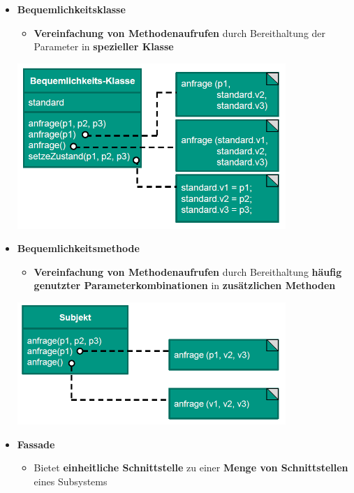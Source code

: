 \documentclass[parskip=full, 12pt]{scrartcl}
\begin{document}
				\begin{itemize}
					\item \textbf{Bequemlichkeitsklasse}
					\begin{itemize}
						\item \textbf{Vereinfachung von Methodenaufrufen} durch Bereithaltung der Parameter in \textbf{spezieller Klasse}
					\end{itemize}
					\begin{center}
						\includegraphics[width=0.8\textwidth]{../images/bequemlichkeitsklasse.png}
					\end{center}
					\item \textbf{Bequemlichkeitsmethode}
					\begin{itemize}
						\item \textbf{Vereinfachung von Methodenaufrufen} durch Bereithaltung \textbf{häufig genutzter Parameterkombinationen} in \textbf{zusätzlichen Methoden}
					\end{itemize}
					\begin{center}
						\includegraphics[width=0.8\textwidth]{../images/bequemlichkeitsmethode.png}
					\end{center}
					\newpage
					\item \textbf{Fassade}
					\begin{itemize}
						\item Bietet \textbf{einheitliche Schnittstelle} zu einer \textbf{Menge von Schnittstellen} eines Subsystems

\end{itemize}
\end{itemize}
\end{document}
